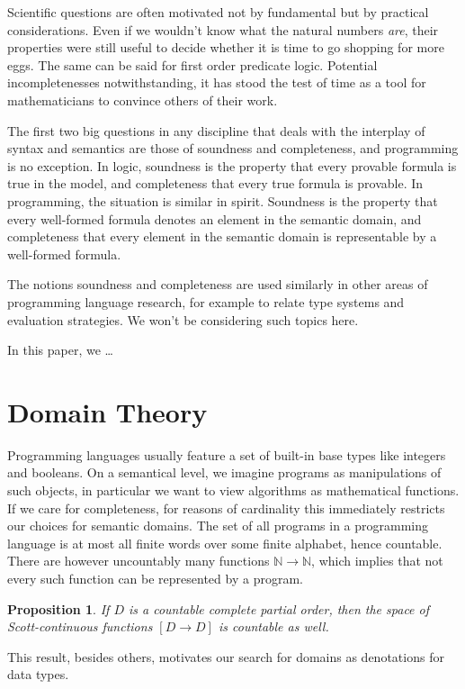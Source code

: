 \documentclass[a4paper]{article}
\newcommand{\arr}{\rightarrow}
\newcommand{\bbN}{\mathbb{N}}
\newtheorem{proposition}[definition]{Proposition}
\begin{document}
Scientific questions are often motivated not by fundamental but by practical
considerations. Even if we wouldn't know what the natural numbers \emph{are},
their properties were still useful to decide whether it is time to go shopping
for more eggs. The same can be said for first order predicate logic. Potential
incompletenesses notwithstanding, it has stood the test of time as a tool for
mathematicians to convince others of their work.

The first two big questions in any discipline that deals with the interplay of
syntax and semantics are those of soundness and completeness, and programming is
no exception. In logic, soundness is the property that every provable formula is
true in the model, and completeness that every true formula is provable. In
programming, the situation is similar in spirit. Soundness is the property that
every well-formed formula denotes an element in the semantic domain, and
completeness that every element in the semantic domain is representable by a
well-formed formula.

The notions soundness and completeness are used similarly in other areas of
programming language research, for example to relate type systems and evaluation
strategies.  We won't be considering such topics here.

In this paper, we \ldots

\section{Domain Theory}

Programming languages usually feature a set of built-in base types like integers
and booleans. On a semantical level, we imagine programs as manipulations of
such objects, in particular we want to view algorithms as mathematical
functions. If we care for completeness, for reasons of cardinality this
immediately restricts our choices for semantic domains. The set of all programs
in a programming language is at most all finite words over some finite alphabet,
hence countable. There are however uncountably many functions $\bbN \arr \bbN$,
which implies that not every such function can be represented by a program.

\begin{proposition}
If $D$ is a countable complete partial order, then the space of Scott-continuous
functions $[D \arr D]$ is countable as well.
\end{proposition}

This result, besides others, motivates our search for domains as denotations for
data types.
\end{document}
